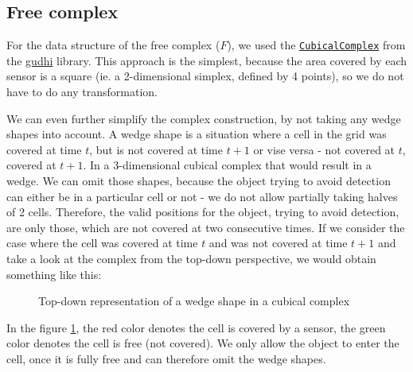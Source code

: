 \documentclass{article}
\begin{document}
\subsection{Free complex}

For the data structure of the free complex ($F$), we used the \href{https://gudhi.inria.fr/python/latest/cubical_complex_user.html}{\texttt{CubicalComplex}} from the \href{https://pypi.org/project/gudhi/}{gudhi} library.
This approach is the simplest, because the area covered by each sensor is a square (ie. a 2-dimensional simplex, defined by 4 points), so we do not have to do any transformation.

We can even further simplify the complex construction, by not taking any wedge shapes into account.
A wedge shape is a situation where a cell in the grid was covered at time $t$, but is not covered at time $t + 1$ or vise versa - not covered at $t$, covered at $t + 1$.
In a 3-dimensional cubical complex that would result in a wedge.
We can omit those shapes, because the object trying to avoid detection can either be in a particular cell or not - we do not allow partially taking halves of 2 cells.
Therefore, the valid positions for the object, trying to avoid detection, are only those, which are not covered at two consecutive times.
If we consider the case where the cell was covered at time $t$ and was not covered at time $t + 1$ and take a look at the complex from the top-down perspective, we would obtain something like this:

\smallskip

\begin{figure}[H]
  \centering


  \caption{Top-down representation of a wedge shape in a cubical complex}
  \label{fig:wedge}
\end{figure}

In the figure \ref{fig:wedge}, the red color denotes the cell is covered by a sensor, the green color denotes the cell is free (not covered).
We only allow the object to enter the cell, once it is fully free and can therefore omit the wedge shapes.
\end{document}
